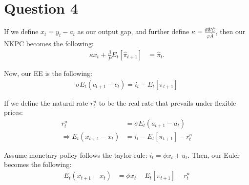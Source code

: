 \documentclass[11pt]{article} %
\begin{document}
\section{Question 4}

If we define $x_t = y_t - a_t$ as our output gap, and further define $\kappa =  \frac{\theta\bar{W}\bar{C}}{\varphi\bar{A}}$, then our NKPC becomes the following:
\begin{align*}
\kappa x_t + \frac{\beta}{\bar{P}}E_t[\hat{\pi}_{t+1} ] &=\hat{\pi}_t.
\end{align*}

Now, our EE is the following:
\begin{align*}
\sigma E_t(c_{t+1} - c_t) = i_t - E_t [\pi_{t+1}] 
\end{align*}

If we define the natural rate $r_t^n$ to be the real rate that prevails under flexible prices:
\begin{align*}
r_t^n &= \sigma  E_t(a_{t+1} - a_t)\\
\Rightarrow E_t(x_{t+1} - x_t) &= i_t - E_t [\pi_{t+1}] - r_t^n 
\end{align*}

Assume monetary policy follows the taylor rule: $i_t = \phi x_t + u_t$. Then, our Euler becomes the following:
\begin{align*}
E_t(x_{t+1} - x_t) &= \phi x_t - E_t [\pi_{t+1}] - r_t^n 
\end{align*}
\end{document}
